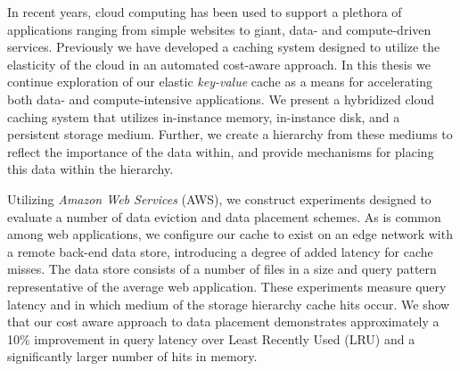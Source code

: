 In recent years, cloud computing has been used to support a plethora of
applications ranging from simple websites to giant, data- and compute-driven
services. Previously we have developed a caching system designed to utilize the
elasticity of the cloud in an automated cost-aware approach. In this thesis we
continue exploration of our elastic \emph{key-value} cache as a means for
accelerating both data- and compute-intensive applications. We present a
hybridized cloud caching system that utilizes in-instance memory, in-instance
disk, and a persistent storage medium. Further, we create a hierarchy from
these mediums to reflect the importance of the data within, and provide
mechanisms for placing this data within the hierarchy.

Utilizing \emph{Amazon Web Services} (AWS), we construct experiments designed
to evaluate a number of data eviction and data placement schemes. As is common
among web applications, we configure our cache to exist on an edge network with
a remote back-end data store, introducing a degree of added latency for cache
misses. The data store consists of a number of files in a size and query
pattern representative of the average web application. These experiments
measure query latency and in which medium of the storage hierarchy cache hits
occur. We show that our cost aware approach to data placement demonstrates
approximately a 10\% improvement in query latency over Least Recently Used
(LRU) and a significantly larger number of hits in memory.
